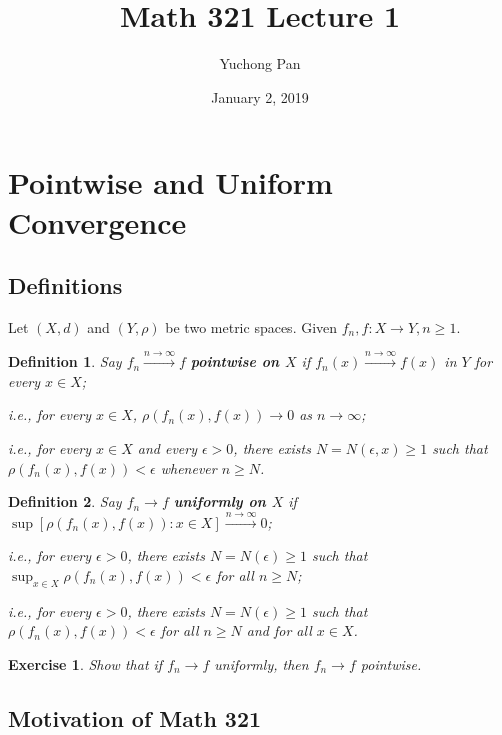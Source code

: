 \documentclass[letterpaper, reqno,11pt]{article}
\begin{document}
\title{Math 321 Lecture 1}
\author{Yuchong Pan}
\date{January 2, 2019}
\newtheorem{thm}{Theorem}
\newtheorem{defn}{Definition}
\newtheorem{exs}{Exercise}
\newtheorem{remark}{Remark}
\maketitle
%

\section{Pointwise and Uniform Convergence}

\subsection{Definitions}

Let $(X, d)$ and $(Y, \rho)$ be two metric spaces. Given $f_n, f : X \to Y, n \geq 1$.

\begin{defn}
  \normalfont Say $f_n \xrightarrow{n \to \infty} f$ {\bf pointwise on $X$} if $f_n(x) \xrightarrow{n \to \infty} f(x)$ in $Y$ for every $x \in X$;

  i.e., for every $x \in X$, $\rho(f_n(x), f(x)) \to 0$ as $n \to \infty$;

  i.e., for every $x \in X$ and every $\epsilon > 0$, there exists $N = N(\epsilon, x) \geq 1$ such that $\rho(f_n(x), f(x)) < \epsilon$ whenever $n \geq N$.
\end{defn}

\begin{defn}
  \normalfont Say $f_n \to f$ {\bf uniformly on $X$} if $\sup[\rho(f_n(x), f(x)) : x \in X] \xrightarrow{n \to \infty} 0$;

  i.e., for every $\epsilon > 0$, there exists $N = N(\epsilon) \geq 1$ such that $\sup_{x \in X} \rho(f_n(x), f(x)) < \epsilon$ for all $n \geq N$;

  i.e., for every $\epsilon > 0$, there exists $N = N(\epsilon) \geq 1$ such that $\rho(f_n(x), f(x)) < \epsilon$ for all $n \geq N$ and for all $x \in X$.
\end{defn}

\begin{exs}
  \normalfont Show that if $f_n \to f$ uniformly, then $f_n \to f$ pointwise.
\end{exs}

\subsection{Motivation of Math 321}
\end{document}
